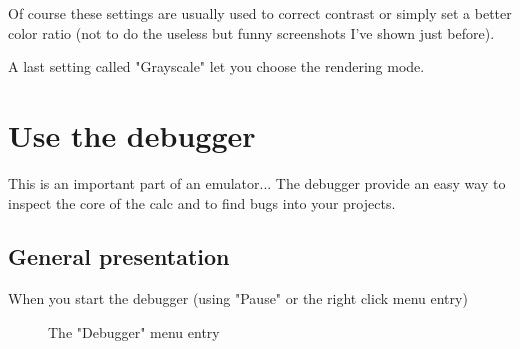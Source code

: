 \documentclass[10pt]{report}
\begin{document}
Of course these settings are usually used to correct contrast or simply set a better color ratio (not to do the useless but funny screenshots I've shown just before).\newline

A last setting called "Grayscale" let you choose the rendering mode.\newline

\section{Use the debugger}
This is an important part of an emulator...\newline
The debugger provide an easy way to inspect the core of the calc and to find bugs into your projects.\newline

\subsection{General presentation}

When you start the debugger (using "Pause" or the right click menu entry) 
\begin{figure}[H]
\centering
{}
\caption{The "Debugger" menu entry}
\end{figure}
\end{document}
